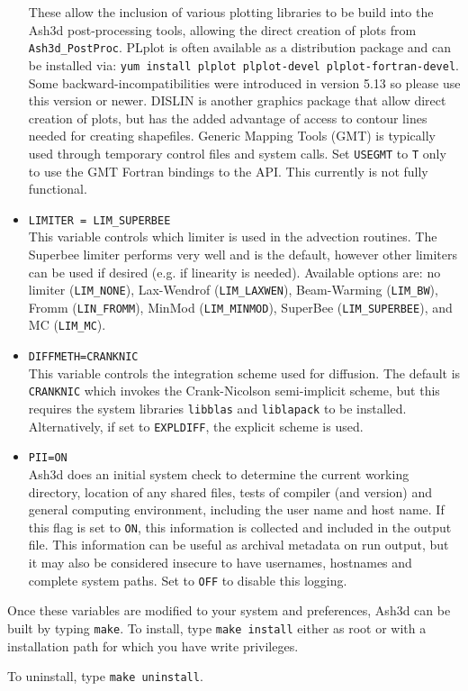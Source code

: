 \begin{itemize}
 These allow the inclusion of various plotting libraries to be build into the Ash3d
post-processing tools, allowing the direct creation of plots from \texttt{Ash3d\_PostProc}.
PLplot is often available as a distribution package and can be installed via:
\texttt{yum install plplot plplot-devel plplot-fortran-devel}. Some backward-incompatibilities
were introduced in version 5.13 so please use this version or newer. DISLIN is another
graphics package that allow direct creation of plots, but has the added advantage of
access to contour lines needed for creating shapefiles. Generic Mapping Tools (GMT)
is typically used through temporary control files and system calls.  Set \texttt{USEGMT}
to \texttt{T} only to use the GMT Fortran bindings to the API. This currently is not
fully functional.
 \item \texttt{LIMITER = LIM\_SUPERBEE}\\
This variable controls which limiter is used in the advection routines.  The
Superbee limiter performs very well and is the default, however other limiters
can be used if desired (e.g. if linearity is needed).  Available options are:
no limiter (\texttt{LIM\_NONE}), Lax-Wendrof (\texttt{LIM\_LAXWEN}),
Beam-Warming (\texttt{LIM\_BW}), Fromm (\texttt{LIN\_FROMM}), 
MinMod (\texttt{LIM\_MINMOD}), SuperBee (\texttt{LIM\_SUPERBEE}),
and MC (\texttt{LIM\_MC}).
 \item \texttt{DIFFMETH=CRANKNIC}\\
This variable controls the integration scheme used for diffusion.  The default
is \texttt{CRANKNIC} which invokes the Crank-Nicolson semi-implicit scheme, but
this requires the  system libraries \texttt{libblas} and \texttt{liblapack} to be installed.
Alternatively, if set to \texttt{EXPLDIFF}, the explicit scheme is used.
 \item \texttt{PII=ON}\\
Ash3d does an initial system check to determine the current working directory, location
of any shared files, tests of compiler (and version) and general computing
environment, including the user name and host name. If this flag is set to \texttt{ON}, this
information is collected and included in the output file.  This information
can be useful as archival metadata on run output, but it may also be considered insecure
to have usernames, hostnames and complete system paths. Set to \texttt{OFF} to
disable this logging.
\end{itemize}

Once these variables are modified to your system and preferences, Ash3d can
be built by typing \texttt{make}.  To install, type \texttt{make install}
either as root or with a installation path for which you have write
privileges.

To uninstall, type \texttt{make uninstall}.

